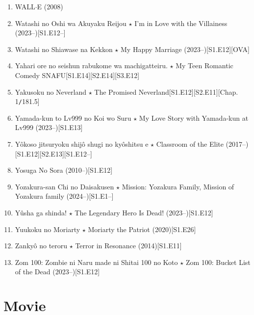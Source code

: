 \documentclass{article}
\begin{document}
\begin{enumerate}
    \item {\sc WALL$\cdot$E} (2008)
    \item Watashi no Oshi wa Akuyaku Reijou $\star$ I'm in Love with the Villainess (2023--)\hfill[S1.E12--]
    \item {\sc Watashi no Shiawase na Kekkon $\star$ My Happy Marriage} (2023--)\hfill[S1.E12][OVA]
    \item {\sc Yahari ore no seishun rabukome wa machigatteiru. $\star$ My Teen Romantic Comedy SNAFU}\hfill[S1.E14][S2.E14][S3.E12]
    \item {\sc Yakusoku no Neverland $\star$ The Promised Neverland}\hfill[S1.E12][S2.E11][Chap. 1{\tt/}181.5]
    \item Yamada-kun to Lv999 no Koi wo Suru $\star$ My Love Story with Yamada-kun at Lv999 (2023--)\hfill[S1.E13]
    \item Yôkoso jitsuryoku shijô shugi no kyôshitsu e $\star$ Classroom of the Elite (2017--)\hfill[S1.E12][S2.E13][S1.E12--]
    \item {\sc Yosuga No Sora} (2010--)\hfill[S1.E12]
    \item Yozakura-san Chi no Daisakusen $\star$ Mission: Yozakura Family, Mission of Yozakura family (2024--)\hfill[S1.E1--]
    \item {\sc Yûsha ga shinda! $\star$ The Legendary Hero Is Dead!} (2023--)\hfill[S1.E12]
    \item {\sc Yuukoku no Moriarty $\star$ Moriarty the Patriot} (2020)\hfill[S1.E26]
    \item {\sc Zankyô no teroru $\star$ Terror in Resonance} (2014)\hfill[S1.E11]
    \item {\sc Zom 100: Zombie ni Naru made ni Shitai 100 no Koto $\star$ Zom 100: Bucket List of the Dead} (2023--)\hfill[S1.E12]
\end{enumerate}


\section{Movie}
\end{document}
